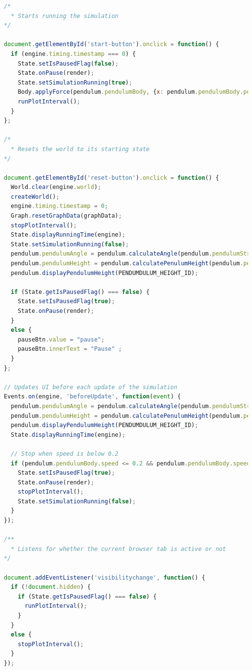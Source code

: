 \documentclass[onecolumn, draftclsnofoot,10pt, compsoc]{IEEEtran}
\begin{document}
\begin{lstlisting}[language=JavaScript]
/*
  * Starts running the simulation
*/

document.getElementById('start-button').onclick = function() {
  if (engine.timing.timestamp === 0) {
    State.setIsPausedFlag(false);
    State.onPause(render);
    State.setSimulationRunning(true);
    Body.applyForce(pendulum.pendulumBody, {x: pendulum.pendulumBody.position.x, y: pendulum.pendulumBody.position.y}, {x: 0.028, y: 0});
    runPlotInterval();
  }
};

/*
  * Resets the world to its starting state
*/

document.getElementById('reset-button').onclick = function() {
  World.clear(engine.world);
  createWorld();
  engine.timing.timestamp = 0;
  Graph.resetGraphData(graphData);
  stopPlotInterval();
  State.displayRunningTime(engine);
  State.setSimulationRunning(false);
  pendulum.pendulumAngle = pendulum.calculateAngle(pendulum.pendulumString.bodies[0].position, pendulum.pendulumBody.position);
  pendulum.pendulumHeight = pendulum.calculatePenulumHeight(pendulum.pendulumStringLength / PTM, pendulum.pendulumAngle);
  pendulum.displayPendulumHeight(PENDUMDULUM_HEIGHT_ID);

  if (State.getIsPausedFlag() === false) {
    State.setIsPausedFlag(true);
    State.onPause(render);
  }
  else {
    pauseBtn.value = "pause";
    pauseBtn.innerText = "Pause" ;
  }
};

// Updates UI before each update of the simulation
Events.on(engine, 'beforeUpdate', function(event) {
  pendulum.pendulumAngle = pendulum.calculateAngle(pendulum.pendulumString.bodies[0].position, pendulum.pendulumBody.position);
  pendulum.pendulumHeight = pendulum.calculatePenulumHeight(pendulum.pendulumStringLength / PTM, pendulum.pendulumAngle);
  pendulum.displayPendulumHeight(PENDUMDULUM_HEIGHT_ID);
  State.displayRunningTime(engine);

  // Stop when speed is below 0.2
  if (pendulum.pendulumBody.speed <= 0.2 && pendulum.pendulumBody.speed !== 0){
    State.setIsPausedFlag(true);
    State.onPause(render);
    stopPlotInterval();
    State.setSimulationRunning(false);
  }
});

/**
  * Listens for whether the current browser tab is active or not
*/

document.addEventListener('visibilitychange', function() {
  if (!document.hidden) {
    if (State.getIsPausedFlag() === false) {
      runPlotInterval();
    }
  }
  else {
    stopPlotInterval();
  }
});
\end{lstlisting}
\end{document}
